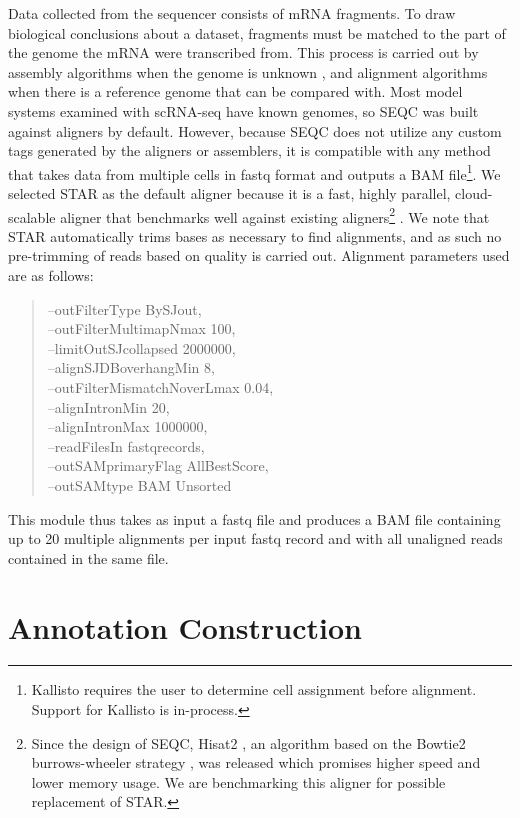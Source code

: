 Data collected from the sequencer consists of mRNA fragments.
To draw biological conclusions about a dataset, fragments must be matched to the part of the genome the mRNA were transcribed from. 
This process is carried out by assembly algorithms when the genome is unknown \citep{Haas2013}, and alignment algorithms when there is a reference genome that can be compared with.
Most model systems examined with scRNA-seq have known genomes, so SEQC was built against aligners by default.
However, because SEQC does not utilize any custom tags generated by the aligners or assemblers, it is compatible with any method that takes data from multiple cells in fastq format and outputs a BAM file\footnote{Kallisto requires the user to determine cell assignment before alignment. Support for Kallisto is in-process.}.
We selected STAR as the default aligner because it is a fast, highly parallel, cloud-scalable aligner that benchmarks well against existing aligners\footnote{Since the design of SEQC, Hisat2 \citep{Kim2015}, an algorithm based on the Bowtie2 burrows-wheeler strategy \citep{Langmead2012}, was released which promises higher speed and lower memory usage. We are benchmarking this aligner for possible replacement of STAR.} \citep{Ilicic2016}. 
We note that STAR automatically trims bases as necessary to find alignments, and as such no pre-trimming of reads based on quality is carried out. 
Alignment parameters used are as follows: 
\begin{quote}
\onehalfspacing
{\mono
--outFilterType BySJout,\\ 
--outFilterMultimapNmax 100,\\
--limitOutSJcollapsed 2000000,\\
--alignSJDBoverhangMin 8,\\
--outFilterMismatchNoverLmax 0.04,\\
--alignIntronMin 20,\\
--alignIntronMax 1000000,\\
--readFilesIn fastqrecords,\\
--outSAMprimaryFlag AllBestScore,\\
--outSAMtype BAM Unsorted
}
\end{quote}
This module thus takes as input a fastq file and produces a BAM file containing up to 20 multiple alignments per input fastq record and with all unaligned reads contained in the same file. 

\section{Annotation Construction}

